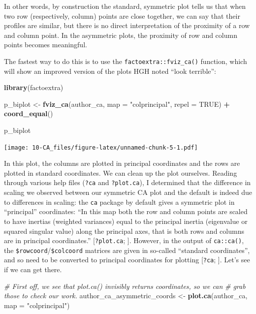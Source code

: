 \documentclass[
]{book}
\newenvironment{Shaded}{\begin{snugshade}}{\end{snugshade}}
\newcommand{\AttributeTok}[1]{\textcolor[rgb]{0.13,0.29,0.53}{#1}}
\newcommand{\CommentTok}[1]{\textcolor[rgb]{0.56,0.35,0.01}{\textit{#1}}}
\newcommand{\ConstantTok}[1]{\textcolor[rgb]{0.56,0.35,0.01}{#1}}
\newcommand{\FunctionTok}[1]{\textcolor[rgb]{0.13,0.29,0.53}{\textbf{#1}}}
\newcommand{\NormalTok}[1]{#1}
\newcommand{\OtherTok}[1]{\textcolor[rgb]{0.56,0.35,0.01}{#1}}
\newcommand{\SpecialCharTok}[1]{\textcolor[rgb]{0.81,0.36,0.00}{\textbf{#1}}}
\newcommand{\StringTok}[1]{\textcolor[rgb]{0.31,0.60,0.02}{#1}}
\begin{document}
In other words, by construction the standard, symmetric plot tells us that when two row (respectively, column) points are close together, we can say that their profiles are similar, but there is no direct interpretation of the proximity of a row and column point. In the asymmetric plots, the proximity of row and column points becomes meaningful.

The fastest way to do this is to use the \texttt{factoextra::fviz\_ca()} function, which will show an improved version of the plots HGH noted ``look terrible'':

\begin{Shaded}
\begin{Highlighting}[]
\FunctionTok{library}\NormalTok{(factoextra)}

\NormalTok{p\_biplot }\OtherTok{\textless{}{-}} 
  \FunctionTok{fviz\_ca}\NormalTok{(author\_ca, }
          \AttributeTok{map =} \StringTok{"colprincipal"}\NormalTok{,}
          \AttributeTok{repel =} \ConstantTok{TRUE}\NormalTok{) }\SpecialCharTok{+}
  \FunctionTok{coord\_equal}\NormalTok{()}

\NormalTok{p\_biplot}
\end{Highlighting}
\end{Shaded}

\texttt{[image: 10-CA\_files/figure-latex/unnamed-chunk-5-1.pdf]}

In this plot, the columns are plotted in principal coordinates and the rows are plotted in standard coordinates. We can clean up the plot ourselves. Reading through various help files (\texttt{?ca} and \texttt{?plot.ca}), I determined that the difference in scaling we observed between our symmetric CA plot and the default is indeed due to differences in scaling: the \texttt{ca} package by default gives a symmetric plot in ``principal'' coordinates: ``In this map both the row and column points are scaled to have inertias (weighted variances) equal to the principal inertia (eigenvalue or squared singular value) along the principal axes, that is both rows and columns are in principal coordinates.'' {[}\texttt{?plot.ca}; \citet{abdiCorrespondence}{]}. However, in the output of \texttt{ca::ca()}, the \texttt{\$rowcoord}/\texttt{\$colcoord} matrices are given in so-called ``standard coordinates'', and so need to be converted to principal coordinates for plotting {[}\texttt{?ca}; \citet{abdiCorrespondence}{]}. Let's see if we can get there.

\begin{Shaded}
\begin{Highlighting}[]
\CommentTok{\# First off, we see that \textasciigrave{}plot.ca()\textasciigrave{} invisibly returns coordinates, so we can}
\CommentTok{\# grab those to check our work.}
\NormalTok{author\_ca\_asymmetric\_coords }\OtherTok{\textless{}{-}} 
  \FunctionTok{plot.ca}\NormalTok{(author\_ca, }\AttributeTok{map =} \StringTok{"colprincipal"}\NormalTok{)}
\end{Highlighting}
\end{Shaded}
\end{document}
